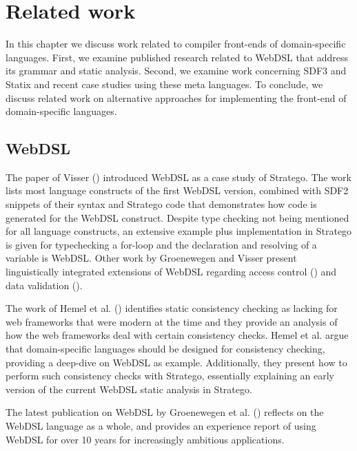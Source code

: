 
\chapter{\label{chap:related-work}Related work}

  In this chapter we discuss work related to compiler front-ends of domain-specific languages. First, we examine published research related to WebDSL that address its grammar and static analysis. Second, we examine work concerning SDF3 and Statix and recent case studies using these meta languages. To conclude, we discuss related work on alternative approaches for implementing the front-end of domain-specific languages.

  \section{WebDSL}

    The paper of Visser (\citeyear{Visser2007}) introduced WebDSL as a case study of Stratego. The work lists most language constructs of the first WebDSL version, combined with SDF2 snippets of their syntax and Stratego code that demonstrates how code is generated for the WebDSL construct. Despite type checking not being mentioned for all language constructs, an extensive example plus implementation in Stratego is given for typechecking a for-loop and the declaration and resolving of a variable is WebDSL. Other work by Groenewegen and Visser present linguistically integrated extensions of WebDSL regarding access control (\citeyear{GroenewegenV08}) and data validation (\citeyear{GroenewegenV13}).

    The work of Hemel et al. (\citeyear{Hemel2011}) identifies static consistency checking as lacking for web frameworks that were modern at the time and they provide an analysis of how the web frameworks deal with certain consistency checks. Hemel et al. argue that domain-specific languages should be designed for consistency checking, providing a deep-dive on WebDSL as example. Additionally, they present how to perform such consistency checks with Stratego, essentially explaining an early version of the current WebDSL static analysis in Stratego.

    The latest publication on WebDSL by Groenewegen et al. (\citeyear{Groenewegen2020}) reflects on the WebDSL language as a whole, and provides an experience report of using WebDSL for over 10 years for increasingly ambitious applications.

